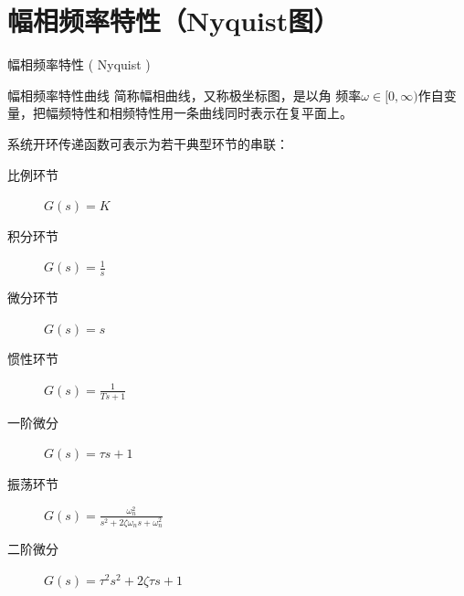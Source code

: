 \documentclass[handout,cjkutf8,table,aspectratio=1610]{beamer} %
\begin{document}
\section{幅相频率特性（Nyquist图）}
\begin{frame}{幅相频率特性 ( Nyquist )}
	\begin{block}{幅相频率特性曲线}
		简称幅相曲线，又称极坐标图，是以角 频率$\omega\in [0,\infty)$作自变量，把幅频特性和相频特性用一条曲线同时表示在复平面上。
	\end{block}
	系统开环传递函数可表示为若干典型环节的串联：
	\begin{description}
		\item[比例环节] $G(s)=K$
		\item[积分环节] $G(s)=\frac{1}{s}$
		\item[微分环节] $G(s)=s$
		\item[惯性环节] $G(s)=\frac{1}{Ts+1}$
		\item[一阶微分] $G(s)=\tau s+1$
		\item[振荡环节] $G(s)=\frac{\omega_n^2}{s^2+2\zeta\omega_n s+\omega_n^2}$
		\item[二阶微分] $G(s)=\tau^2 s^2 + 2\zeta\tau s + 1$
	\end{description}
\end{frame}
\end{document}
